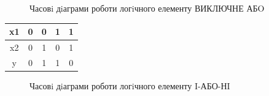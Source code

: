 \documentclass[a4paper,14pt]{extreport}
\begin{document}
\clearpage
\begin{figure}[h!]
	\caption{Часовi дiаграми роботи логiчного елементу ВИКЛЮЧНЕ АБO}
	\label{ris2}
\end{figure}
\begin{table}[h!]
	\begin{center}
	\begin{tabular}{|c|c|c|c|c|}
	\hline
	x1 & 0 & 0 & 1 & 1 \\ \hline
	x2 & 0 & 1 & 0 & 1 \\ \hline
	y  & 0 & 1 & 1 & 0 \\ \hline
	\end{tabular}
	\end{center}
\end{table}


\clearpage
\begin{figure}[h]
	\caption{Часовi дiаграми роботи логiчного елементу I-АБО-НI}
	\label{ris2}
\end{figure}
\end{document}
